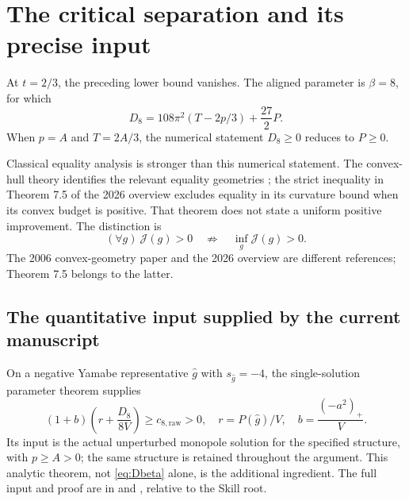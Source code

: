 \documentclass[11pt]{article}
\theoremstyle{remark}
\newcommand{\J}{\mathcal J}
\begin{document}
\section{The critical separation and its precise input}

At $t=2/3$, the preceding lower bound vanishes. The aligned parameter is
$\beta=8$, for which
\begin{equation}\label{eq:D8}
 D_8=108\pi^2(T-2p/3)+\frac{27}{2}P.
\end{equation}
When $p=A$ and $T=2A/3$, the numerical statement $D_8\ge0$ reduces to
$P\ge0$.

Classical equality analysis is stronger than this numerical statement.
The convex-hull theory identifies the relevant equality geometries
\cite{LeBrunConvex}; the strict inequality in Theorem 7.5 of the 2026
overview \cite{LeBrunOverview} excludes equality in its curvature bound
when its convex budget is positive. That theorem does not state a uniform
positive improvement. The distinction is
\[
 (\forall g)\ \J(g)>0\quad\not\Longrightarrow\quad
 \inf_g\J(g)>0.
\]
The 2006 convex-geometry paper and the 2026 overview are different
references; Theorem 7.5 belongs to the latter.

\subsection*{The quantitative input supplied by the current manuscript}
On a negative Yamabe representative $\widehat g$ with $s_{\widehat g}=-4$,
the single-solution parameter theorem supplies
\begin{equation}\label{eq:raw}
 (1+b)\left(r+\frac{D_8}{8V}\right)\ge c_{8,\mathrm{raw}}>0,
 \quad r=P(\widehat g)/V,\quad b=\frac{(-a^2)_+}{V}.
\end{equation}
Its input is the actual unperturbed monopole solution for the specified
structure, with $p\ge A>0$; the same structure is retained throughout
the argument. This analytic theorem, not \eqref{eq:Dbeta} alone, is the
additional ingredient. The full input and proof are in
 and
, relative
to the Skill root.
\end{document}
